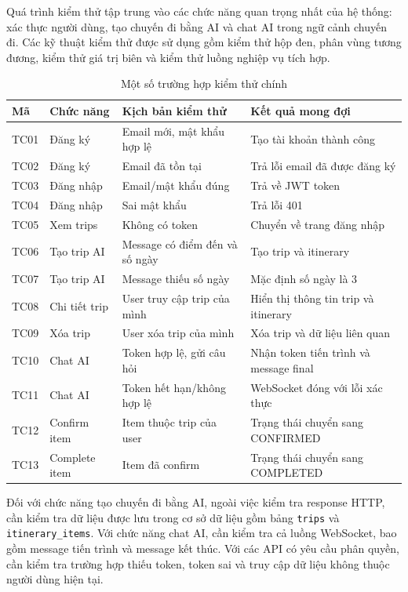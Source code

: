 \documentclass[../DoAn.tex]{subfiles}
\begin{document}
Quá trình kiểm thử tập trung vào các chức năng quan trọng nhất của hệ thống: xác thực người dùng, tạo chuyến đi bằng AI và chat AI trong ngữ cảnh chuyến đi. Các kỹ thuật kiểm thử được sử dụng gồm kiểm thử hộp đen, phân vùng tương đương, kiểm thử giá trị biên và kiểm thử luồng nghiệp vụ tích hợp.

\begin{table}[H]
\centering
\begin{tabular}{llll}
\hline
\textbf{Mã} & \textbf{Chức năng} & \textbf{Kịch bản kiểm thử} & \textbf{Kết quả mong đợi} \\ \hline
TC01 & Đăng ký & Email mới, mật khẩu hợp lệ & Tạo tài khoản thành công \\ \hline
TC02 & Đăng ký & Email đã tồn tại & Trả lỗi email đã được đăng ký \\ \hline
TC03 & Đăng nhập & Email/mật khẩu đúng & Trả về JWT token \\ \hline
TC04 & Đăng nhập & Sai mật khẩu & Trả lỗi 401 \\ \hline
TC05 & Xem trips & Không có token & Chuyển về trang đăng nhập \\ \hline
TC06 & Tạo trip AI & Message có điểm đến và số ngày & Tạo trip và itinerary \\ \hline
TC07 & Tạo trip AI & Message thiếu số ngày & Mặc định số ngày là 3 \\ \hline
TC08 & Chi tiết trip & User truy cập trip của mình & Hiển thị thông tin trip và itinerary \\ \hline
TC09 & Xóa trip & User xóa trip của mình & Xóa trip và dữ liệu liên quan \\ \hline
TC10 & Chat AI & Token hợp lệ, gửi câu hỏi & Nhận token tiến trình và message final \\ \hline
TC11 & Chat AI & Token hết hạn/không hợp lệ & WebSocket đóng với lỗi xác thực \\ \hline
TC12 & Confirm item & Item thuộc trip của user & Trạng thái chuyển sang CONFIRMED \\ \hline
TC13 & Complete item & Item đã confirm & Trạng thái chuyển sang COMPLETED \\ \hline
\end{tabular}
\caption{Một số trường hợp kiểm thử chính}
\label{tab:test-cases}
\end{table}

Đối với chức năng tạo chuyến đi bằng AI, ngoài việc kiểm tra response HTTP, cần kiểm tra dữ liệu được lưu trong cơ sở dữ liệu gồm bảng \texttt{trips} và \texttt{itinerary\_items}. Với chức năng chat AI, cần kiểm tra cả luồng WebSocket, bao gồm message tiến trình và message kết thúc. Với các API có yêu cầu phân quyền, cần kiểm tra trường hợp thiếu token, token sai và truy cập dữ liệu không thuộc người dùng hiện tại.
\end{document}
